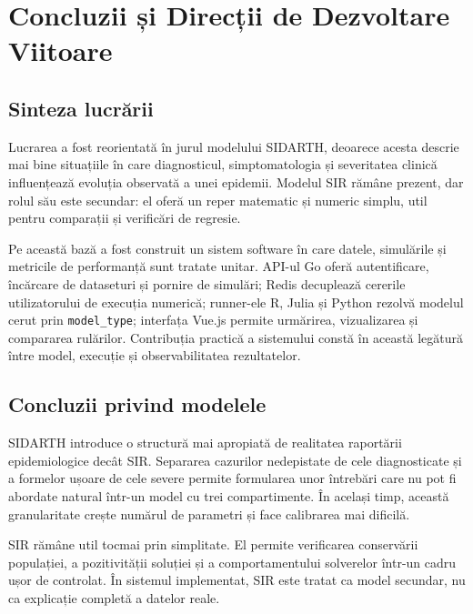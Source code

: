 
\chapter{Concluzii și Direcții de Dezvoltare Viitoare}
\label{ch:concluzii}

\section{Sinteza lucrării}
\label{sec:sinteza_contributii}

Lucrarea a fost reorientată în jurul modelului SIDARTH, deoarece acesta descrie
mai bine situațiile în care diagnosticul, simptomatologia și severitatea clinică
influențează evoluția observată a unei epidemii. Modelul SIR rămâne prezent, dar
rolul său este secundar: el oferă un reper matematic și numeric simplu, util pentru
comparații și verificări de regresie.

Pe această bază a fost construit un sistem software în care datele, simulările și
metricile de performanță sunt tratate unitar. API-ul Go oferă autentificare,
încărcare de dataseturi și pornire de simulări; Redis decuplează cererile
utilizatorului de execuția numerică; runner-ele R, Julia și Python rezolvă modelul
cerut prin \texttt{model\_type}; interfața Vue.js permite urmărirea, vizualizarea
și compararea rulărilor. Contribuția practică a sistemului constă în această
legătură între model, execuție și observabilitatea rezultatelor.

\section{Concluzii privind modelele}
\label{sec:concluzii_modele}

SIDARTH introduce o structură mai apropiată de realitatea raportării
epidemiologice decât SIR. Separarea cazurilor nedepistate de cele diagnosticate și
a formelor ușoare de cele severe permite formularea unor întrebări care nu pot fi
abordate natural într-un model cu trei compartimente. În același timp, această
granularitate crește numărul de parametri și face calibrarea mai dificilă.

SIR rămâne util tocmai prin simplitate. El permite verificarea conservării
populației, a pozitivității soluției și a comportamentului solverelor într-un cadru
ușor de controlat. În sistemul implementat, SIR este tratat ca model secundar, nu
ca explicație completă a datelor reale.

